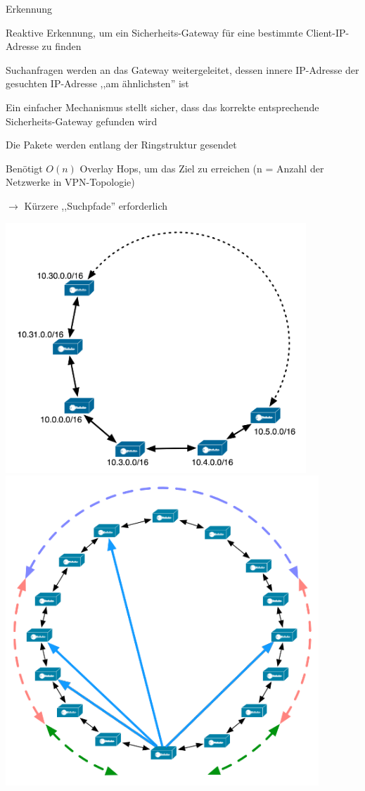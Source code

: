 \documentclass[a4paper]{article}
\begin{document}
\begin{multicols}{3}
      Erkennung
      \begin{itemize*}
            \item Reaktive Erkennung, um ein Sicherheits-Gateway für eine bestimmte Client-IP-Adresse zu finden
            \item Suchanfragen werden an das Gateway weitergeleitet, dessen innere IP-Adresse der gesuchten IP-Adresse ,,am ähnlichsten'' ist
            \item Ein einfacher Mechanismus stellt sicher, dass das korrekte entsprechende Sicherheits-Gateway gefunden wird
            \item Die Pakete werden entlang der Ringstruktur gesendet
            \item Benötigt $O(n)$ Overlay Hops, um das Ziel zu erreichen (n = Anzahl der Netzwerke in VPN-Topologie)
            \item[$\rightarrow$] Kürzere ,,Suchpfade'' erforderlich
      \end{itemize*}
      \begin{center}
            \includegraphics[width=.45\linewidth]{Assets/NetworkSecurity-SOLID-topology.png}
            \includegraphics[width=.45\linewidth]{Assets/NetworkSecurity-SOLID-topology-control.png}
      \end{center}


\end{multicols}
\end{document}
